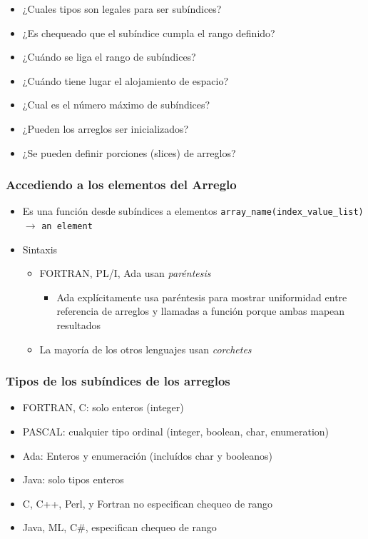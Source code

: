 \documentclass[11pt]{article}
\begin{document}
\begin{itemize}
\item ¿Cuales tipos son legales para ser subíndices?
\item ¿Es chequeado que el subíndice cumpla el rango definido?
\item ¿Cuándo se liga el rango de subíndices?
\item ¿Cuándo tiene lugar el alojamiento de espacio?
\item ¿Cual es el número máximo de subíndices?
\item ¿Pueden los arreglos ser inicializados?
\item ¿Se pueden definir porciones (slices) de arreglos?
\end{itemize}

\subsubsection*{Accediendo a los elementos del Arreglo}
\label{sec:orgheadline14}
\begin{itemize}
\item Es una función desde subíndices a elementos 
\texttt{array\_name(index\_value\_list)} \(\to\) \texttt{an element}
\item Sintaxis
\begin{itemize}
\item FORTRAN, PL/I, Ada usan \emph{paréntesis}
\begin{itemize}
\item Ada explícitamente usa paréntesis para mostrar uniformidad entre
referencia de arreglos y llamadas a función porque ambas mapean resultados
\end{itemize}
\item La mayoría de los otros lenguajes usan \emph{corchetes}
\end{itemize}
\end{itemize}

\subsubsection*{Tipos de los subíndices de los arreglos}
\label{sec:orgheadline15}
\begin{itemize}
\item FORTRAN, C: solo enteros (integer)
\item PASCAL: cualquier tipo ordinal (integer, boolean, char, enumeration)
\item Ada: Enteros y enumeración (incluídos char y booleanos)
\item Java: solo tipos enteros
\item C, C++, Perl, y Fortran no especifican chequeo de rango
\item Java, ML, C\#, especifican chequeo de rango
\end{itemize}
\end{document}
